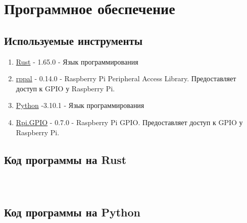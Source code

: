 \documentclass[a4paper,12pt]{article}
\begin{document}
\section{Программное обеспечение}
\subsection{Используемые инструменты}
\begin{enumerate}
  \item \href{https://www.rust-lang.org/}{Rust} - 1.65.0 - Язык программирования
  \item \href{https://github.com/golemparts/rppal}{rppal} - 0.14.0 - Raspberry Pi Peripheral Access Library. Предоставляет
  доступ к GPIO у Raspberry Pi.
  \item \href{https://www.python.org/}{Python} -3.10.1 - Язык программирования
  \item \href{https://sourceforge.net/projects/raspberry-gpio-python/}{Rpi.GPIO} - 0.7.0 - Raspberry Pi GPIO. Предоставляет доступ к GPIO у Raspberry Pi.
\end{enumerate}

\subsection{Код программы на Rust}

\inputminted{rust}{code/main.rs}

\inputminted{rust}{code/input.rs}

\inputminted{rust}{code/engine.rs}

\subsection{Код программы на Python}

\inputminted{python}{code/main.py}

\inputminted{python}{code/input.py}

\inputminted{python}{code/engine.py}
\end{document}
